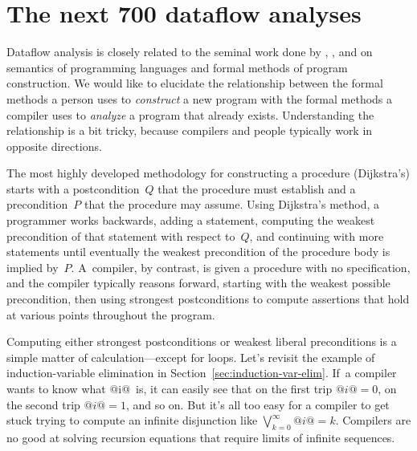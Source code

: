 \documentclass[blockstyle,preprint,nocopyrightspace]{sigplanconf}
\newcommand\secref[1]{Section~\ref{sec:#1}}
\newcommand\seclabel[1]{\label{sec:#1}}
\begin{document}
\fi



\section{The next 700 dataflow analyses}

\seclabel{next-700}



\seclabel{logic}


Dataflow analysis is closely related to the seminal work done by
\citet{floyd:assigning-meanings},
\citet{hoare:axiomatic-basis},
and
\citet{dijkstra:discipline}
on semantics of programming languages and
 formal methods of program construction.
%
We would like to elucidate the relationship between the formal methods a
person uses to 
\emph{construct} a new program with the formal methods a compiler uses
to \emph{analyze} a program that already exists.
Understanding the relationship is a bit tricky, because compilers and
people typically work in opposite directions.

The most highly developed
methodology for constructing a procedure (Dijkstra's) starts with a
postcondition~$Q$ that the procedure must establish and a
precondition~$P$ that the procedure may assume.
Using Dijkstra's method, a programmer 
works backwards, adding a statement, computing the weakest
precondition of that statement with respect to~$Q$,
and continuing with more statements until
eventually the weakest precondition of the procedure body is implied by~$P$.
A~compiler, by contrast, is given a procedure with no specification,
and the compiler typically reasons forward,  starting with the
weakest possible precondition, then using strongest postconditions to
compute assertions that hold at various points throughout the program.


Computing either strongest postconditions or weakest liberal
preconditions is a simple matter of calculation---except for loops.
Let's revisit the example of induction-variable elimination in
\secref{induction-var-elim}. 
If~a compiler wants to know what @i@~is, it can easily see that on the
first trip $@i@=0$, on the second trip $@i@=1$, and so on.
But it's all too easy for a compiler to get stuck trying to compute an
infinite disjunction like $\bigvee_{k=0}^{\infty} @i@=k$.
Compilers are no good at solving recursion
equations that require limits of infinite sequences.
\end{document}
